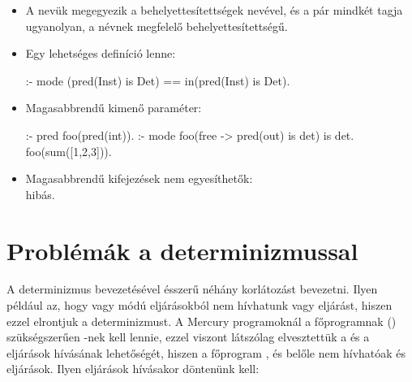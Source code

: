 \begin{itemize}
\item A nevük megegyezik a behelyettesítettségek nevével, és a pár mindkét
tagja ugyanolyan, a névnek megfelelő behelyettesítettségű.
\item Egy lehetséges definíció lenne:
\begin{prologcode}
:- mode (pred(Inst) is Det) == in(pred(Inst) is Det).
\end{prologcode}
\end{itemize}

\begin{itemize}
\item Magasabbrendű kimenő paraméter:
\begin{prologcode}
:- pred foo(pred(int)).
:- mode foo(free -> pred(out) is det) is det.
foo(sum([1,2,3])).
\end{prologcode}
\item Magasabbrendű kifejezések nem egyesíthetők:\\
 hibás.
\end{itemize}

\section{Problémák a determinizmussal}

A determinizmus bevezetésével ésszerű néhány korlátozást bevezetni. Ilyen például az,
hogy  vagy  módú eljárásokból nem hívhatunk  vagy
 eljárást, hiszen ezzel elrontjuk a determinizmust. A Mercury programoknál a
főprogramnak () szükségszerűen -nek kell lennie, ezzel viszont
látszólag elvesztettük a  és a  eljárások hívásának lehetőségét,
hiszen a főprogram , és belőle nem hívhatóak  és  eljárások.
Ilyen eljárások hívásakor döntenünk kell:

